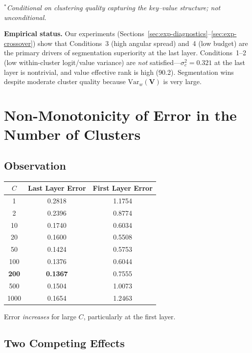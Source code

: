 \documentclass[11pt,a4paper]{article}
\theoremstyle{definition}
\newcommand{\Var}{\mathrm{Var}}
\begin{document}
\noindent${}^*$\emph{Conditional on clustering quality capturing the
key--value structure; not unconditional.}

\medskip
\noindent\textbf{Empirical status.}
Our experiments (Sections~\ref{sec:exp-diagnostics}--\ref{sec:exp-crossover})
show that Conditions~3 (high angular spread) and~4 (low budget) are the primary
drivers of segmentation superiority at the last layer.
Conditions~1--2 (low within-cluster logit/value variance) are \emph{not}
satisfied---$\sigma_c^2 = 0.321$ at the last layer is nontrivial, and value
effective rank is high (90.2).  Segmentation wins despite moderate cluster
quality because $\Var_w(\mathbf{V})$ is very large.


\section{Non-Monotonicity of Error in the Number of Clusters}
\label{sec:nonmono}

\subsection{Observation}

\begin{center}
\begin{tabular}{ccc}
\toprule
$C$ & Last Layer Error & First Layer Error\\
\midrule
1    & 0.2818 & 1.1754\\
2    & 0.2396 & 0.8774\\
10   & 0.1740 & 0.6034\\
20   & 0.1600 & 0.5508\\
50   & 0.1424 & 0.5753\\
100  & 0.1376 & 0.6044\\
\textbf{200} & \textbf{0.1367} & 0.7555\\
500  & 0.1504 & 1.0073\\
1000 & 0.1654 & 1.2463\\
\bottomrule
\end{tabular}
\end{center}

Error \emph{increases} for large $C$, particularly at the first layer.

\subsection{Two Competing Effects}
\end{document}
